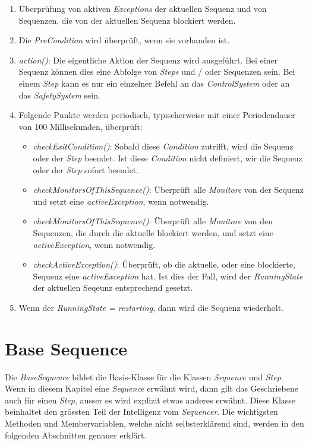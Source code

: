 \begin{enumerate}
\item Überprüfung von aktiven \textit{Exceptions} der aktuellen Sequenz und von Sequenzen, die von der aktuellen Sequenz blockiert werden.
\item Die \textit{PreCondition} wird überprüft, wenn sie vorhanden ist.
\item \textit{action()}: Die eigentliche Aktion der Sequenz wird ausgeführt. Bei einer Sequenz können dies eine Abfolge von \textit{Steps} und / oder Sequenzen sein. Bei einem \textit{Step} kann es nur ein einzelner Befehl an das \textit{ControlSystem} oder an das \textit{SafetySystem} sein.
\item Folgende Punkte werden periodisch, typischerweise mit einer Periodendauer von 100 Millisekunden, überprüft:
\begin{itemize}
\item \textit{checkExitCondition()}: Sobald diese \textit{Condition} zutrifft, wird die Sequenz oder der \textit{Step} beendet. Ist diese \textit{Condition} nicht definiert, wir die Sequenz oder der \textit{Step} sofort beendet.
\item \textit{checkMonitorsOfThisSequence()}: Überprüft alle \textit{Monitore} von der Sequenz und setzt eine \textit{activeException}, wenn notwendig.
\item \textit{checkMonitorsOfThisSequence()}: Überprüft alle \textit{Monitore} von den Sequenzen, die durch die aktuelle blockiert werden, und setzt eine \textit{activeException}, wenn notwendig.
\item \textit{checkActiveException()}: Überprüft, ob die aktuelle, oder eine blockierte, Sequenz eine \textit{activeException} hat. Ist dies der Fall, wird der \textit{RunningState} der aktuellen Seqeunz entsprechend gesetzt. 
\end{itemize}
\item Wenn der \textit{RunningState = restarting}, dann wird die Sequenz wiederholt.
\end{enumerate} 



\section{Base Sequence}
Die \textit{BaseSequence} bildet die Basis-Klasse für die Klassen \textit{Sequence} und \textit{Step}.
Wenn in diesem Kapitel eine \textit{Sequence} erwähnt wird, dann gilt das Geschriebene auch für einen \textit{Step}, ausser es wird explizit etwas anderes erwähnt.
Diese Klasse beinhaltet den grössten Teil der Intelligenz vom \textit{Sequencer}.
Die wichtigsten Methoden und Membervariablen, welche nicht selbsterklärend sind, werden in den folgenden Abschnitten genauer erklärt.


